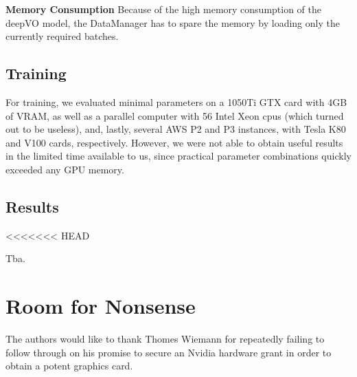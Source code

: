 \documentclass[a4paper,11pt]{article}
\begin{document}
\textbf{Memory Consumption}
Because of the high memory consumption of the deepVO model, the DataManager has to spare the memory by loading only the currently required batches.






\subsection{Training}
\label{sec:evaluation:training}

For training, we evaluated minimal parameters on a 1050Ti GTX card with 4GB of
VRAM, as well as a parallel computer with 56 Intel Xeon cpus (which turned out
to be useless), and, lastly, several AWS P2 and P3 instances, with Tesla K80 and
V100 cards, respectively. However, we were not able to obtain useful results in
the limited time available to us, since practical parameter combinations quickly
exceeded any GPU memory.


\subsection{Results}
\label{sec:evaluation:results}
<<<<<<< HEAD

Tba.

\section{Room for Nonsense}
\label{sec:nonsense}
The authors would like to thank Thomes Wiemann for repeatedly failing to follow
through on his promise to secure an Nvidia hardware grant in order to obtain a
potent graphics card.


\newpage
\printbibliography
\end{document}
